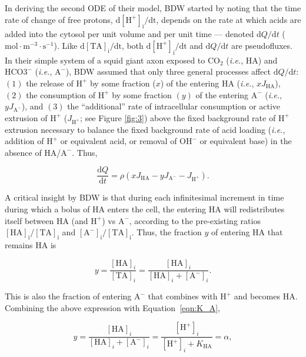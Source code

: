 \documentclass[fleqn,10pt]{physiome}
\begin{document}
In deriving the second ODE of their model, BDW started by noting that the time rate of change of free protons, \(\mathrm{d[H^+]_i}/\mathrm{dt}\), depends on the rate at which acids are added into the cytosol per unit volume and per unit time --- denoted \(\mathrm{d}Q/\mathrm{d}t\) ($\mathrm{mol\cdot m^{-3}\cdot s^{-1}}$). Like $\mathrm{d[TA]_i/dt}$, both $\mathrm{d[H^+]_i/dt}$ and $\mathrm{d}Q/\mathrm{d}t$ are pseudofluxes.\\ 

In their simple system of a squid giant axon exposed to $\mathrm{CO_2}$ (\emph{i.e.}, HA) and $\mathrm{HCO3^-}$ (\emph{i.e.}, $\mathrm{A^-}$), BDW assumed that only three general processes affect \(\mathrm{d}Q/\mathrm{d}t\): $(1)$ the release of $\mathrm{H^+}$ by some fraction ($x$) of the entering HA (\emph{i.e.}, $xJ_\mathrm{HA}$), $(2)$ the consumption of $\mathrm{H^+}$ by some fraction $(y)$ of the entering $\mathrm{A^-}$ (\emph{i.e.}, $yJ_\mathrm{A^-}$), and $(3)$ the ``additional'' rate of intracellular consumption or active extrusion of $\mathrm{H^+}$ ($J_\mathrm{H^+}$; see Figure \ref{fig:3}) above the fixed background rate of $\mathrm{H^+}$ extrusion necessary to balance the fixed background rate of acid loading (\emph{i.e.}, addition of $\mathrm{H^+}$ or equivalent acid, or removal of $\mathrm{OH^-}$ or equivalent base) in the absence of HA/$\mathrm{A^-}$. Thus,

\begin{equation}
\dfrac{\mathrm{d}Q}{\mathrm{d}t}=\rho\left(xJ_\mathrm{HA}-yJ_\mathrm{A^-}-J_\mathrm{H^+}\right).
\label{eqn:rate_Q}
\end{equation}

A critical insight by BDW is that during each infinitesimal increment in time during which a bolus of HA enters the cell, the entering HA will redistributes itself between HA (and $\mathrm{H^+}$) vs $\mathrm{A^-}$, according to the pre-existing ratios $\mathrm{[HA]_i/[TA]_i}$ and $\mathrm{[A^-]_i/[TA]_i}$. Thus, the fraction $y$ of entering HA that remains $\mathrm{HA}$ is

\begin{equation}
y=\dfrac{\mathrm{[HA]}_i}{\mathrm{[TA]}_i}=\dfrac{\mathrm{[HA]}_i}{\mathrm{[HA]}_i+\mathrm{[A^-]}_i}.
\end{equation}

This is also the fraction of entering $\mathrm{A^-}$ that combines with $\mathrm{H^+}$ and becomes HA. Combining the above expression with Equation~\ref{eqn:K_A},

\begin{equation}
y=\dfrac{\mathrm{[HA]}_i}{\mathrm{[HA]}_i+\mathrm{[A^-]}_i}=\dfrac{\mathrm{[H^+]}_i}{\mathrm{[H^+]}_i+K_\mathrm{HA}}=\alpha,
\label{eqn:y}
\end{equation}
\end{document}
